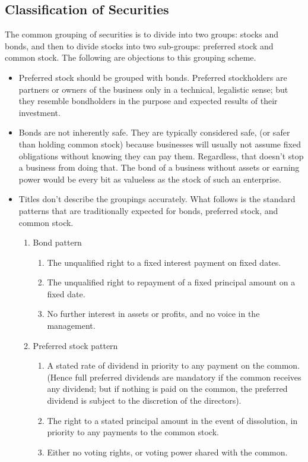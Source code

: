 \documentclass{article}
\begin{document}
\subsection{Classification of Securities}
The common grouping of securities is to divide into two groups: stocks and bonds, and then to divide stocks into two sub-groups: preferred stock and common stock. The following are objections to this grouping scheme.
\begin{itemize}
\item Preferred stock should be grouped with bonds. Preferred stockholders are partners or owners of the business only in a technical, legalistic sense; but they resemble bondholders in the purpose and expected results of their investment.
\item Bonds are not inherently safe. They are typically considered safe, (or safer than holding common stock) because businesses will usually not assume fixed obligations without knowing they can pay them. Regardless, that doesn't stop a business from doing that. The bond of a business without assets or earning power would be every bit as valueless as the stock of such an enterprise.
\item Titles don't describe the groupings accurately. What follows is the standard patterns that are traditionally expected for bonds, preferred stock, and common stock.
\begin{enumerate}
\item Bond pattern
\begin{enumerate}
\item The unqualified right to a fixed interest payment on fixed dates. 
\item The unqualified right to repayment of a fixed principal amount on a fixed date.
\item No further interest in assets or profits, and no voice in the management.
\end{enumerate}
\item Preferred stock pattern
\begin{enumerate}
\item A stated rate of dividend in priority to any payment on the common. (Hence full preferred dividends are mandatory if the common receives any dividend; but if nothing is paid on the common, the preferred dividend is subject to the discretion of the directors). 
\item The right to a stated principal amount in the event of dissolution, in priority to any payments to the common stock.
\item Either no voting rights, or voting power shared with the common.

\end{enumerate}
\end{enumerate}
\end{itemize}
\end{document}
